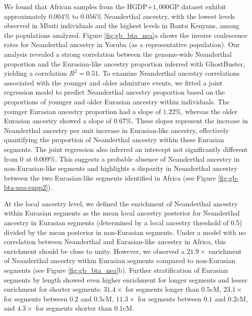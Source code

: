 We found that African samples from the HGDP+$1{,}000$GP dataset exhibit approximately \( 0.004\% \) to \( 0.056\% \) Neanderthal ancestry, with the lowest levels observed in Mbuti individuals and the highest levels in Bantu Kenyans, among the populations analyzed. Figure \ref{fig:gb_bta_nea}a shows the inverse coalescence rates for Neanderthal ancestry in Yoruba (as a representative population). Our analysis revealed a strong correlation between the genome-wide Neanderthal proportion and the Eurasian-like ancestry proportion inferred with GhostBuster, yielding a correlation \( R^2 = 0.51 \). To examine Neanderthal ancestry correlations associated with the younger and older admixture events, we fitted a joint regression model to predict Neanderthal ancestry proportion based on the proportions of younger and older Eurasian ancestry within individuals. The younger Eurasian ancestry proportion had a slope of \(1.22\%\), whereas the older Eurasian ancestry showed a slope of \(0.67\%\). These slopes represent the increase in Neanderthal ancestry per unit increase in Eurasian-like ancestry, effectively quantifying the proportion of Neanderthal ancestry within these Eurasian segments. The joint regression also inferred an intercept not significantly different from $0$ at $0.009$\%. This suggests a probable absence of Neanderthal ancestry in non-Eurasian-like segments and highlights a disparity in Neanderthal ancestry between the two Eurasian-like segments identified in Africa (see Figure \ref{fig:gb-bta-nea-supp2}). 

At the local ancestry level, we defined the enrichment of Neanderthal ancestry within Eurasian segments as the mean local ancestry posterior for Neanderthal ancestry in Eurasian segments (determined by a local ancestry threshold of 0.5) divided by the mean posterior in non-Eurasian segments. Under a model with no correlation between Neanderthal and Eurasian-like ancestry in Africa, this enrichment should be close to unity. However, we observed a \(21.9\times\) enrichment of Neanderthal ancestry within Eurasian segments compared to non-Eurasian segments (see Figure \ref{fig:gb_bta_nea}b). Further stratification of Eurasian segments by length showed even higher enrichment for longer segments and lesser enrichment for shorter segments: \( 31.4\times \) for segments longer than \(0.5\)cM, \( 23.1\times \) for segments between \(0.2\) and \(0.5\)cM, \( 11.3\times \) for segments between \(0.1\) and \(0.2\)cM, and \( 4.3\times \) for segments shorter than \(0.1\)cM. 

